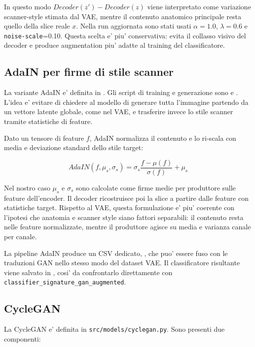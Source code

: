 \documentclass[12pt,a4paper]{article}
\begin{document}
In questo modo \(Decoder(z') - Decoder(z)\) viene interpretato come variazione scanner-style stimata dal VAE, mentre il contenuto anatomico principale resta quello della slice reale \(x\). Nella run aggiornata sono stati usati \(\alpha=1.0\), \(\lambda=0.6\) e \texttt{noise-scale}=0.10. Questa scelta e' piu' conservativa: evita il collasso visivo del decoder e produce augmentation piu' adatte al training del classificatore.

\subsection{AdaIN per firme di stile scanner}

La variante AdaIN e' definita in . Gli script di training e generazione sono  e . L'idea e' evitare di chiedere al modello di generare tutta l'immagine partendo da un vettore latente globale, come nel VAE, e trasferire invece lo stile scanner tramite statistiche di feature.

Dato un tensore di feature \(f\), AdaIN normalizza il contenuto e lo ri-scala con media e deviazione standard dello stile target:

\[
AdaIN(f, \mu_s, \sigma_s) = \sigma_s \frac{f - \mu(f)}{\sigma(f)} + \mu_s
\]

Nel nostro caso \(\mu_s\) e \(\sigma_s\) sono calcolate come firme medie per produttore sulle feature dell'encoder. Il decoder ricostruisce poi la slice a partire dalle feature con statistiche target. Rispetto al VAE, questa formulazione e' piu' coerente con l'ipotesi che anatomia e scanner style siano fattori separabili: il contenuto resta nelle feature normalizzate, mentre il produttore agisce su media e varianza canale per canale.

La pipeline AdaIN produce un CSV dedicato, , che puo' essere fuso con le traduzioni GAN nello stesso modo del dataset VAE. Il classificatore risultante viene salvato in , cosi' da confrontarlo direttamente con \texttt{classifier\_signature\_gan\_augmented}.

\subsection{CycleGAN}

La CycleGAN e' definita in \texttt{src/models/cyclegan.py}. Sono presenti due componenti:
\end{document}
